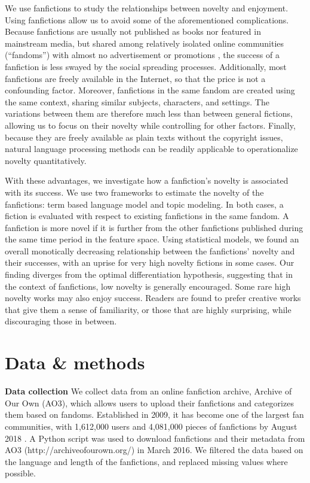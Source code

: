 \documentclass[letterpaper]{article} %
\begin{document}
We use fanfictions to study the relationships between novelty and enjoyment. Using fanfictions allow us to avoid some of the aforementioned complications. Because fanfictions are usually not published as books nor featured in mainstream media, but shared among relatively isolated online communities (``fandoms'') with almost no advertisement or promotions \cite{wiki:fandom}, the success of a fanfiction is less swayed by the social spreading processes. Additionally, most fanfictions are freely available in the Internet, so that the price is not a confounding factor. Moreover, fanfictions in the same fandom are created using the same context, sharing similar subjects, characters, and settings. The variations between them are therefore much less than between general fictions, allowing us to focus on their novelty while controlling for other factors. Finally, because they are freely available as plain texts without the copyright issues, natural language processing methods can be readily applicable to operationalize novelty quantitatively. 

With these advantages, we investigate how a fanfiction's novelty is associated with its success. We use two frameworks to estimate the novelty of the fanfictions:  term based language model and topic modeling. In both cases, a fiction is evaluated with respect to existing fanfictions in the same fandom. A fanfiction is more novel if it is further from the other fanfictions published during the same time period in the feature space. Using statistical models, we found an overall monotically decreasing relationship between the fanfictions' novelty and their successes, with an uprise for very high novelty fictions in some cases. Our finding diverges from the optimal differentiation hypothesis, suggesting that in the context of fanfictions, low novelty is generally encouraged. Some rare high novelty works may also enjoy success. Readers are found to prefer creative works that give them a sense of familiarity, or those that are highly surprising, while discouraging those in between.

\section*{Data \& methods}

\textbf{Data collection} We collect data from an online fanfiction archive, Archive of Our Own (AO3), which allows users to upload their fanfictions and categorizes them based on fandoms. Established in 2009, it has become one of the largest fan communities, with 1,612,000 users and 4,081,000 pieces of fanfictions by August 2018 \cite{ao3stats}. A Python script was used to download fanfictions and their metadata from AO3 (http://archiveofourown.org/) in March 2016. We filtered the data based on the language and length of the fanfictions, and replaced missing values where possible. 
\end{document}

